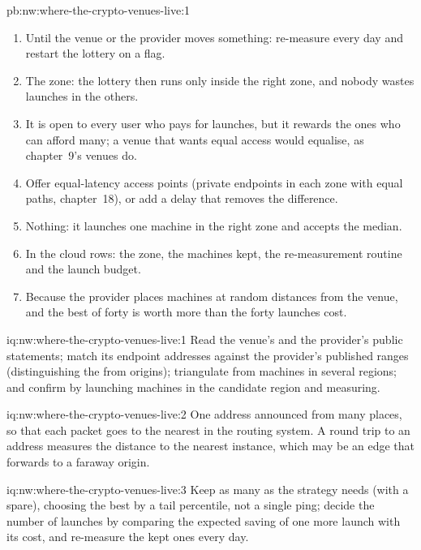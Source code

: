 \begin{solution}{pb:nw:where-the-crypto-venues-live:1}
\begin{enumerate}[resume]
\item Until the venue or the provider moves something: re-measure every day and restart the lottery on a flag.
\item The zone: the lottery then runs only inside the right zone, and nobody wastes launches in the others.
\item It is open to every user who pays for launches, but it rewards the ones who can afford many; a venue that wants equal access would equalise, as
  chapter~9's venues do.
\item Offer equal-latency access points (private endpoints in each zone with equal paths, chapter~18), or add a delay that removes the difference.
\item Nothing: it launches one machine in the right zone and accepts the median.
\item In the cloud rows: the zone, the machines kept, the re-measurement routine and the launch budget.
\item Because the provider places machines at random distances from the venue, and the best of forty is worth more than the forty launches cost.
\end{enumerate}
\end{solution}

\begin{solution}{iq:nw:where-the-crypto-venues-live:1}
Read the venue's and the provider's public statements; match its endpoint addresses against the provider's published ranges (distinguishing the  from origins); triangulate from machines in several regions; and confirm by launching machines in the candidate region and measuring.
\end{solution}

\begin{solution}{iq:nw:where-the-crypto-venues-live:2}
One address announced from many places, so that each packet goes to the nearest in the routing system. A round trip to an  address measures the
distance to the nearest instance, which may be an edge that forwards to a faraway origin.
\end{solution}

\begin{solution}{iq:nw:where-the-crypto-venues-live:3}
Keep as many as the strategy needs (with a spare), choosing the best by a tail percentile, not a single ping; decide the number of launches by
comparing the expected saving of one more launch with its cost, and re-measure the kept ones every day.
\end{solution}

